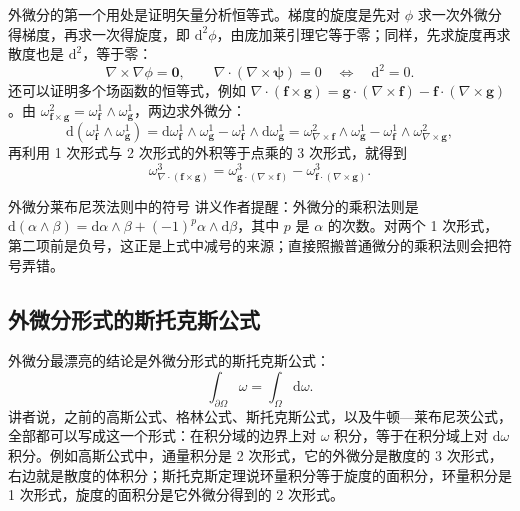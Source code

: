 \documentclass[a4paper]{article}
\begin{document}
外微分的第一个用处是证明矢量分析恒等式。梯度的旋度是先对 $\phi$ 求一次外微分得梯度，再求一次得旋度，即 $\mathrm{d}^2\phi$，由庞加莱引理它等于零；同样，先求旋度再求散度也是 $\mathrm{d}^2$，等于零：
\begin{equation}
\nabla\times\nabla\phi=\boldsymbol 0,\qquad \nabla\cdot(\nabla\times\boldsymbol\psi)=0\quad\Longleftrightarrow\quad \mathrm{d}^2=0 .
\end{equation}
还可以证明多个场函数的恒等式，例如 $\nabla\cdot(\boldsymbol f\times\boldsymbol g)=\boldsymbol g\cdot(\nabla\times\boldsymbol f)-\boldsymbol f\cdot(\nabla\times\boldsymbol g)$。由 $\omega_{\boldsymbol f\times\boldsymbol g}^2=\omega_{\boldsymbol f}^1\wedge\omega_{\boldsymbol g}^1$，两边求外微分：
\begin{equation}
\mathrm{d}(\omega_{\boldsymbol f}^1\wedge\omega_{\boldsymbol g}^1)=\mathrm{d}\omega_{\boldsymbol f}^1\wedge\omega_{\boldsymbol g}^1-\omega_{\boldsymbol f}^1\wedge\mathrm{d}\omega_{\boldsymbol g}^1=\omega_{\nabla\times\boldsymbol f}^2\wedge\omega_{\boldsymbol g}^1-\omega_{\boldsymbol f}^1\wedge\omega_{\nabla\times\boldsymbol g}^2 ,
\end{equation}
再利用 1 次形式与 2 次形式的外积等于点乘的 3 次形式，就得到
\begin{equation}
\omega^3_{\nabla\cdot(\boldsymbol f\times\boldsymbol g)}=\omega^3_{\boldsymbol g\cdot(\nabla\times\boldsymbol f)}-\omega^3_{\boldsymbol f\cdot(\nabla\times\boldsymbol g)} .
\end{equation}

\begin{warningbox}{外微分莱布尼茨法则中的符号}
讲义作者提醒：外微分的乘积法则是 $\mathrm{d}(\alpha\wedge\beta)=\mathrm{d}\alpha\wedge\beta+(-1)^p\alpha\wedge\mathrm{d}\beta$，其中 $p$ 是 $\alpha$ 的次数。对两个 1 次形式，第二项前是负号，这正是上式中减号的来源；直接照搬普通微分的乘积法则会把符号弄错。
\end{warningbox}

\subsection{外微分形式的斯托克斯公式}

外微分最漂亮的结论是外微分形式的斯托克斯公式：
\begin{equation}
\int_{\partial\Omega}\omega=\int_\Omega\mathrm{d}\omega .
\end{equation}
讲者说，之前的高斯公式、格林公式、斯托克斯公式，以及牛顿—莱布尼茨公式，全部都可以写成这一个形式：在积分域的边界上对 $\omega$ 积分，等于在积分域上对 $\mathrm{d}\omega$ 积分。例如高斯公式中，通量积分是 2 次形式，它的外微分是散度的 3 次形式，右边就是散度的体积分；斯托克斯定理说环量积分等于旋度的面积分，环量积分是 1 次形式，旋度的面积分是它外微分得到的 2 次形式。
\end{document}
